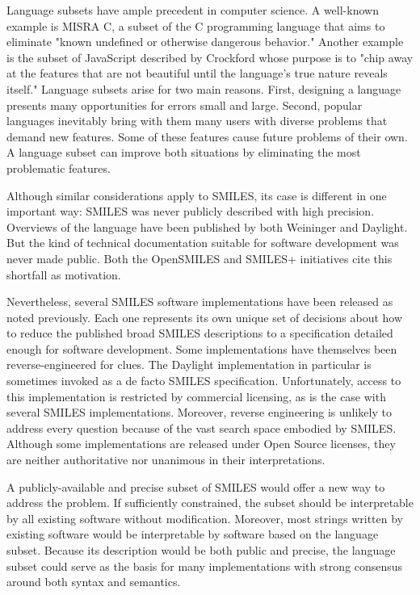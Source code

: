 \documentclass{article}
\begin{document}
Language subsets have ample precedent in computer science. A well-known example is MISRA C,\cite{misraC} a subset of the C programming language that aims to eliminate "known undefined or otherwise dangerous behavior."\cite{hatton:2007} Another example is the subset of JavaScript described by Crockford whose purpose is to "chip away at the features that are not beautiful until the language's true nature reveals itself."\cite{crockford:2008} Language subsets arise for two main reasons. First, designing a language presents many opportunities for errors small and large. Second, popular languages inevitably bring with them many users with diverse problems that demand new features. Some of these features cause future problems of their own. A language subset can improve both situations by eliminating the most problematic features.

Although similar considerations apply to SMILES, its case is different in one important way: SMILES was never publicly described with high precision. Overviews of the language have been published by both Weininger and Daylight. But the kind of technical documentation suitable for software development was never made public. Both the OpenSMILES and SMILES+ initiatives cite this shortfall as motivation.

Nevertheless, several SMILES software implementations have been released as noted previously. Each one represents its own unique set of decisions about how to reduce the published broad SMILES descriptions to a specification detailed enough for software development. Some implementations have themselves been reverse-engineered for clues. The Daylight implementation in particular is sometimes invoked as a de facto SMILES specification. Unfortunately, access to this implementation is restricted by commercial licensing, as is the case with several SMILES implementations. Moreover, reverse engineering is unlikely to address every question because of the vast search space embodied by SMILES. Although some implementations are released under Open Source licenses, they are neither authoritative nor unanimous in their interpretations.

A publicly-available and precise subset of SMILES would offer a new way to address the problem. If sufficiently constrained, the subset should be interpretable by all existing software without modification. Moreover, most strings written by existing software would be interpretable by software based on the language subset. Because its description would be both public and precise, the language subset could serve as the basis for many implementations with strong consensus around both syntax and semantics.
\end{document}
